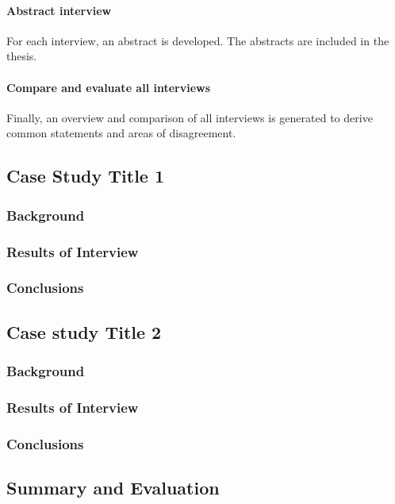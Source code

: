 \paragraph{Abstract interview} For each interview, an abstract is developed. The abstracts are included in the thesis.

\paragraph{Compare and evaluate all interviews} Finally, an overview and comparison of all interviews is generated to derive common statements and areas of disagreement.


\subsection{Case Study Title 1}

\subsubsection{Background}
\subsubsection{Results of Interview}
\subsubsection{Conclusions}
\subsection{Case study Title 2}
\subsubsection{Background}
\subsubsection{Results of Interview}
\subsubsection{Conclusions}


\subsection{Summary and Evaluation}

